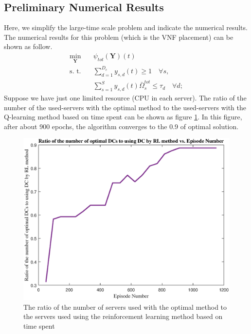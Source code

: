 \documentclass{article}
\begin{document}
\subsection{Preliminary Numerical Results}
Here, we simplify the large-time scale problem and indicate the numerical results.
The numerical results for this problem (which is the VNF placement) can be shown as follow. 
\begin{subequations}
	\begin{alignat}{4}
		\min\limits_{\boldsymbol{Y} }   \quad &   \psi_{tot}(\boldsymbol{Y})(t)\\
		\text{s. t.} \quad & \textstyle \sum_{d=1}^{D_c} y_{s,d}(t) \geq 1 \quad \forall s, \\
		&\textstyle  \sum_{s=1}^{S} y_{s,d}(t) \bar{\Omega}_{s}^{tot}  \leq   \tau_{d} \quad  \forall d;  \label{eqomega}
	\end{alignat}
\end{subequations}
Suppose we have just one limited resource (CPU in each server). The ratio of the number of the used-servers  with the optimal method to the used-servers with the Q-learning method based on time spent can be shown as figure \ref{fig:dynamicEpoch2}. In this figure, after about 900 epochs, the algorithm converges to the 0.9 of optimal solution.
\begin{figure}[H]
	\centering
	\includegraphics[scale = 0.4]{./fig/ratio_episode2} %
	\caption{   The ratio of the number of servers used with the optimal method to the servers used using the reinforcement learning method based on time spent}
	\label{fig:dynamicEpoch2}
\end{figure}
\end{document}
